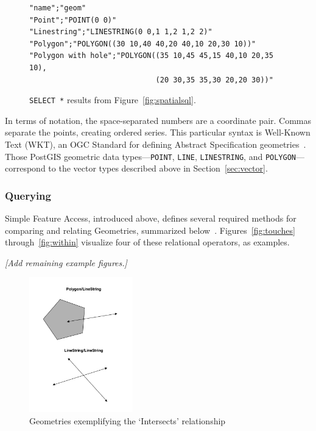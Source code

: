 \begin{figure}
\begin{Verbatim}[samepage=true,baselinestretch=1,xleftmargin=12mm]
"name";"geom"
"Point";"POINT(0 0)"
"Linestring";"LINESTRING(0 0,1 1,2 1,2 2)"
"Polygon";"POLYGON((30 10,40 40,20 40,10 20,30 10))"
"Polygon with hole";"POLYGON((35 10,45 45,15 40,10 20,35 10),
                             (20 30,35 35,30 20,20 30))"
\end{Verbatim}
\caption{\texttt{SELECT *} results from Figure~\ref{fig:spatialsql}.}
\label{fig:sqlresult}
\end{figure}


In terms of notation, the space-separated numbers are a coordinate pair. Commas separate the points, creating ordered series. This particular syntax is Well-Known Text (WKT), an OGC Standard for defining Abstract Specification geometries~\cite{ogc}. Those PostGIS geometric data types---\texttt{POINT}, \texttt{LINE}, \texttt{LINESTRING}, and \texttt{POLYGON}---correspond to the vector types described above in Section~\ref{sec:vector}.

\subsubsection{Querying}
Simple Feature Access, introduced above, defines several required methods for comparing and relating Geometries, summarized below~\cite{SFA}. Figures~\ref{fig:touches} through~\ref{fig:within} visualize four of these relational operators, as examples.

\textit{[Add remaining example figures.]}

\begin{figure}
    \centering

    \includegraphics[width=0.4\textwidth]{figures/crosses.png}
    
    \caption{Geometries exemplifying the `Intersects' relationship}
    \label{fig:intersects}
    
\end{figure}


